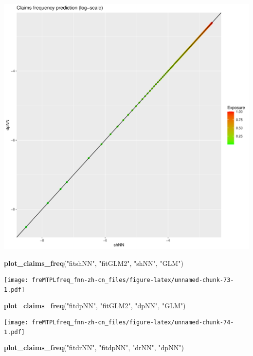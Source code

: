 \documentclass[
]{article}
\newenvironment{Shaded}{\begin{snugshade}}{\end{snugshade}}
\newcommand{\FunctionTok}[1]{\textcolor[rgb]{0.13,0.29,0.53}{\textbf{#1}}}
\newcommand{\NormalTok}[1]{#1}
\newcommand{\StringTok}[1]{\textcolor[rgb]{0.31,0.60,0.02}{#1}}
\begin{document}
\includegraphics{freMTPLfreq_fnn-zh-cn_files/figure-latex/unnamed-chunk-72-1.pdf}

\begin{Shaded}
\begin{Highlighting}[]
\FunctionTok{plot\_claims\_freq}\NormalTok{(}\StringTok{"fitshNN"}\NormalTok{, }\StringTok{"fitGLM2"}\NormalTok{, }\StringTok{"shNN"}\NormalTok{, }\StringTok{"GLM"}\NormalTok{)}
\end{Highlighting}
\end{Shaded}

\texttt{[image: freMTPLfreq\_fnn-zh-cn\_files/figure-latex/unnamed-chunk-73-1.pdf]}

\begin{Shaded}
\begin{Highlighting}[]
\FunctionTok{plot\_claims\_freq}\NormalTok{(}\StringTok{"fitdpNN"}\NormalTok{, }\StringTok{"fitGLM2"}\NormalTok{, }\StringTok{"dpNN"}\NormalTok{, }\StringTok{"GLM"}\NormalTok{)}
\end{Highlighting}
\end{Shaded}

\texttt{[image: freMTPLfreq\_fnn-zh-cn\_files/figure-latex/unnamed-chunk-74-1.pdf]}

\begin{Shaded}
\begin{Highlighting}[]
\FunctionTok{plot\_claims\_freq}\NormalTok{(}\StringTok{"fitdrNN"}\NormalTok{, }\StringTok{"fitdpNN"}\NormalTok{, }\StringTok{"drNN"}\NormalTok{, }\StringTok{"dpNN"}\NormalTok{)}
\end{Highlighting}
\end{Shaded}
\end{document}
